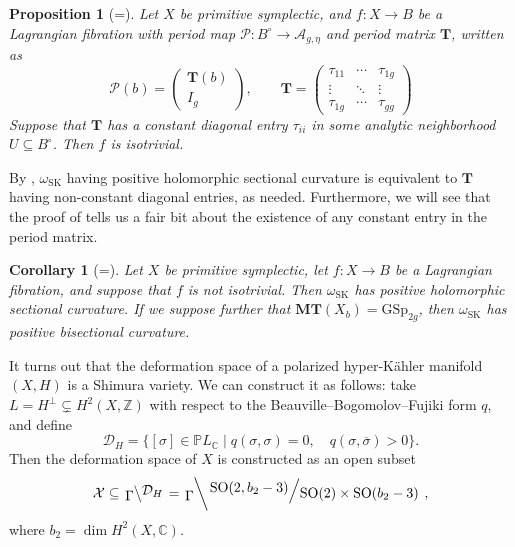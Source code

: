 \documentclass[12pt]{amsart}
\newcommand{\C}{\mathbb{C}}
\newcommand{\Z}{\mathbb{Z}}
\newcommand{\bbP}{\mathbb{P}}
\newcommand{\cP}{\mathcal{P}}
\newcommand{\cA}{\mathcal{A}}
\newcommand{\ol}{\overline}
\newcommand{\rightQ}[2]{\left.\raisebox{.2em}{$#1$}\middle/\raisebox{-.2em}{$#2$}\right.}
\newcommand{\leftQ}[2]{\left.\raisebox{-.2em}{$#2$}\middle\backslash\raisebox{.2em}{$#1$}\right.}
\newtheorem{proposition}[theorem]{Proposition}
\newtheorem{corollary}[theorem]{Corollary}
\theoremstyle{definition}
\numberwithin{equation}{section}
\begin{document}
\begin{proposition}[=]
    Let \(X\) be primitive symplectic, and \(f: X \to B\) be a Lagrangian fibration 
    with period map \(\cP: B^\circ \to \cA_{g, \eta}\) and period matrix \(\mathbf{T}\), written as
    \begin{equation*}
        \cP(b) = \begin{pmatrix}
            \mathbf{T}(b) \\ I_g
        \end{pmatrix},\qquad \mathbf{T} = \begin{pmatrix}
            \tau_{11} & \cdots & \tau_{1g} \\ 
            \vdots & \ddots & \vdots \\ 
            \tau_{1g} & \cdots & \tau_{gg}
        \end{pmatrix}
    \end{equation*}
    Suppose that \(\mathbf{T}\) has a constant diagonal entry \(\tau_{ii}\)
    in some analytic neighborhood \(U \subseteq B^\circ\). Then \(f\) is isotrivial.
\end{proposition}

By \cite[Remark 2.3]{li-tosatti24}, \(\omega_\mathrm{SK}\) having positive holomorphic 
sectional curvature is equivalent to \(\mathbf{T}\) having non-constant diagonal
entries, as needed. Furthermore, we will see that the proof of  
tells us a fair bit about the existence of any constant entry in the period matrix.

\begin{corollary}[=]
    Let \(X\) be primitive symplectic, let \(f: X \to B\) be a Lagrangian fibration, 
    and suppose that \(f\) is not isotrivial. Then \(\omega_\mathrm{SK}\) has positive 
    holomorphic sectional curvature. If we suppose further that 
    \(\mathbf{MT}(X_b) = \mathrm{GSp}_{2g}\), then \(\omega_\mathrm{SK}\) has 
    positive bisectional curvature. 
\end{corollary}


It turns out that the deformation space of a  polarized hyper-K\"ahler manifold \((X, H)\)
is a Shimura variety. We can construct it as follows: take 
\(L = H^\perp \subsetneq H^2(X, \Z)\) with respect to the Beauville--Bogomolov--Fujiki 
form \(q\), and define 
\[\mathcal{D}_H = \{[\sigma] \in \bbP L_\C \mid q(\sigma, \sigma) = 0, \quad
q(\sigma, \ol\sigma) > 0\}.\]
Then the deformation space of \(X\) is constructed as an open subset 
\begin{equation*}
    \mathcal{X} \subseteq \leftQ{\mathcal{D}_H}{\Gamma} = 
    \leftQ{\rightQ{\mathrm{SO}(2, b_2-3)}{\mathrm{SO}(2) \times \mathrm{SO}(b_2-3)}}{\Gamma},
\end{equation*}
where \(b_2 = \dim H^2(X, \C)\).
\end{document}
